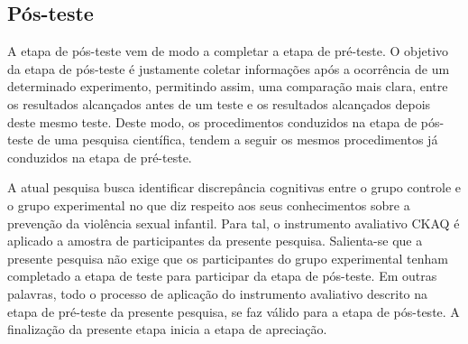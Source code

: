 

\subsection{Pós-teste}\label{subsec:posteste}

A etapa de pós-teste vem de modo a completar a etapa de pré-teste. O objetivo da etapa de pós-teste é justamente coletar informações após a ocorrência de um determinado experimento, permitindo assim, uma comparação mais clara, entre os resultados alcançados antes de um teste e os resultados alcançados depois deste mesmo teste. Deste modo, os procedimentos conduzidos na etapa de pós-teste de uma pesquisa científica, tendem a seguir os mesmos procedimentos já conduzidos na etapa de pré-teste. 

A atual pesquisa busca identificar discrepância cognitivas entre o grupo controle e o grupo experimental no que diz respeito aos seus conhecimentos sobre a prevenção da violência sexual infantil. Para tal, o instrumento avaliativo \ac{CKAQ} é aplicado a amostra de participantes da presente pesquisa. Salienta-se que a presente pesquisa não exige que os participantes do grupo experimental tenham completado a etapa de teste para participar da etapa de pós-teste. Em outras palavras, todo o processo de aplicação do instrumento avaliativo descrito na etapa de pré-teste da presente pesquisa, se faz válido para a etapa de pós-teste. A finalização da presente etapa inicia a etapa de apreciação.



